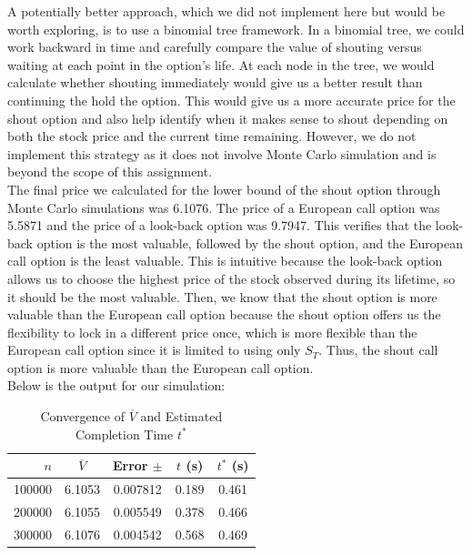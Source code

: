 \documentclass{report}
\begin{document}
A potentially better approach, which we did not implement here but would be worth exploring, is to use a binomial tree framework. In a binomial tree, we could work backward in time and carefully compare the value of shouting versus waiting at each point in the option's life. At each node in the tree, we would calculate whether shouting immediately would give us a better result than continuing the hold the option. This would give us a more accurate price for the shout option and also help identify when it makes sense to shout depending on both the stock price and the current time remaining. However, we do not implement this strategy as it does not involve Monte Carlo simulation and is beyond the scope of this assignment. \\

The final price we calculated for the lower bound of the shout option through Monte Carlo simulations was 6.1076. The price of a European call option was 5.5871 and the price of a look-back option was 9.7947. This verifies that the look-back option is the most valuable, followed by the shout option, and the European call option is the least valuable. This is intuitive because the look-back option allows us to choose the highest price of the stock observed during its lifetime, so it should be the most valuable. Then, we know that the shout option is more valuable than the European call option because the shout option offers us the flexibility to lock in a different price once, which is more flexible than the European call option since it is limited to using only $S_T$. Thus, the shout call option is more valuable than the European call option. \\

Below is the output for our simulation:
\begin{table}[H]
    \centering
    \caption{Convergence of $\overline{V}$ and Estimated Completion Time $t^*$}
    \label{tab:simulation_results}
    \begin{tabular}{rcccc}
        \hline
        $n$ & $\overline{V}$ & Error $\pm$ & $t$ (s) & $t^*$ (s) \\
        \hline
        100000 & 6.1053 & 0.007812 & 0.189 & 0.461 \\
        200000 & 6.1055 & 0.005549 & 0.378 & 0.466 \\
        300000 & 6.1076 & 0.004542 & 0.568 & 0.469 \\
        \hline
    \end{tabular}
\end{table}
\newpage
\end{document}
